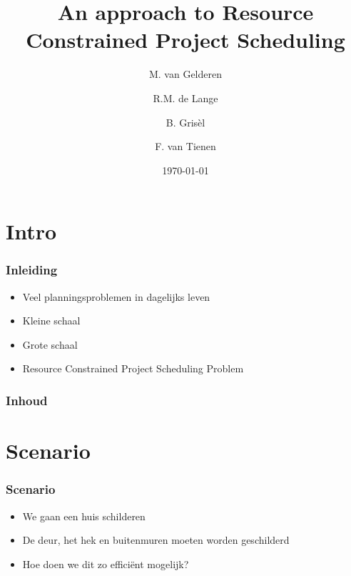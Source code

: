 \documentclass{beamer}
\title[RCPS]{An approach to Resource Constrained Project Scheduling}
\author{M. van Gelderen  \and
    R.M. de Lange \and
    B. Gris\`el \and
    F. van Tienen}
\institute{TU Delft}
\date{\today}
\theoremstyle{definition}
\begin{document}
\begin{frame}
\titlepage
\end{frame}

\section*{Intro}
\begin{frame}
  \frametitle{Inleiding}
  \begin{itemize}
		\item Veel planningsproblemen in dagelijks leven
		\item Kleine schaal
		\item Grote schaal
		\item Resource Constrained Project Scheduling Problem
  \end{itemize}
\end{frame}

\begin{frame}
    \frametitle{Inhoud}
    \tableofcontents
\end{frame}


\section{Scenario}

\begin{frame}
    \frametitle{Scenario}
    \begin{itemize}
    	\item We gaan een huis schilderen
    	\item De deur, het hek en buitenmuren moeten worden geschilderd
    	\item Hoe doen we dit zo effici\"{e}nt mogelijk?
    \end{itemize}
\end{frame}
\end{document}
